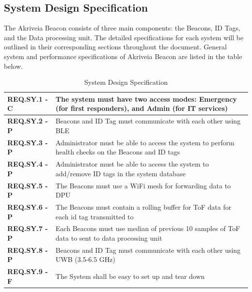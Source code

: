 \subsection{System Design Specification}
\medskip
The Akriveia Beacon consists of three main components: the Beacons, ID Tags, and the Data processing unit. The detailed specifications for each system will be outlined in their corresponding sections throughout the document. General system and performance specifications of Akriveia Beacon are listed in the table below.
\medskip
\bgroup
\def\arraystretch{1.5}
\begin{table}[H]
\centering
\begin{tabular}{ | m{3cm} | m{12.5cm} |}
\hline
\textbf{REQ.SY.1 - C} & The system must have two access modes: Emergency (for first responders), and Admin (for IT services)\\
\hline
\textbf{REQ.SY.2 - P} & Beacons and ID Tag must communicate with each other using BLE\\
\hline
\textbf{REQ.SY.3 - P} & Administrator must be able to access the system to perform health checks on the Beacons and ID tags \\
\hline
\textbf{REQ.SY.4 - P} & Administrator must be able to access the system to add/remove ID tags in the system database \\
\hline
\textbf{REQ.SY.5 - P} & The Beacons must use a WiFi mesh for forwarding data to DPU\\
\hline
\textbf{REQ.SY.6 - P} & The Beacons must contain a rolling buffer for ToF data for each id tag transmitted to\\
\hline
\textbf{REQ.SY.7 - P} & Each Beacons must use median of previous 10 samples of ToF data to sent to data processing unit\\
\hline
\textbf{REQ.SY.8 - P} & Beacons and ID Tag must communicate with each other using UWB (3.5-6.5 GHz)\\
\hline
\textbf{REQ.SY.9 - F} & The System shall be easy to set up and tear down\\
\hline
\end{tabular}
\caption{System Design Specification}
\end{table}
















